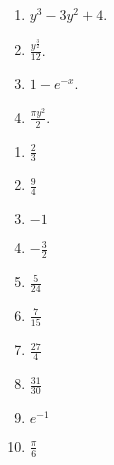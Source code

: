 \begin{enumerate}
\begin{multicols}{2}
\begin{enumerate}[label*=\arabic*.]
                \item ${y^{3}-3 y^{2}+4}$.
                \item ${\frac{y^{\frac{3}{2}}}{12}}$.
                \item ${1-{ e}^{-x}}$.
                \item ${\frac{\pi y^{2}}{2}}$.
            \end{enumerate}
        \end{multicols}
    \begin{minipage}{\textwidth}
        \item
            \begin{multicols}{2}
                \begin{enumerate}[label*=\arabic*.]
                    \item  ${\frac{2}{3}}$
                    \item  ${\frac{9}{4}}$
                    \item  ${-1}$
                    \item  ${-\frac{3}{2}}$
                    \item  ${\frac{5}{24}}$
                    \item  ${\frac{7}{15}}$
                    \item  ${\frac{27}{4}}$
                    \item  ${\frac{31}{30}}$
                    \item  ${{ e}^{-1}}$
                    \item  ${\frac{\pi}{6}}$
                \end{enumerate}
            \end{multicols}
    \end{minipage}
\end{enumerate}
